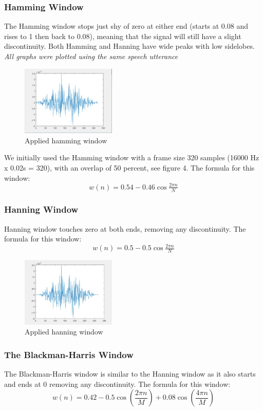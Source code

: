 \documentclass[	DIV=calc,%
							paper=a4,%
							fontsize=9.8pt,%
							twocolumn]{scrartcl}	 					%
\begin{document}
\subsubsection{Hamming Window}
The Hamming window stops just shy of zero at either end (starts at 0.08 and rises to 1 then back to 0.08), meaning that the signal will still have a slight discontinuity.
Both Hamming and Hanning have wide peaks with low sidelobes.
\textit{All graphs were plotted using the same speech utterance}
\begin{figure}[ht]
	\centering
	\includegraphics[width=0.4\textwidth]{hamming}
	\captionsetup{justification=centering}
	\caption{Applied hamming window}
\end{figure}


We initially used the Hamming window with a frame size 320 samples (16000 Hz x 0.02s = 320), with an overlap of 50 percent, see figure 4.
 The formula for this window:
\[w(n) = 0.54 - 0.46 \cos \tfrac{2\pi n}{N}\]


\subsubsection{Hanning Window}
Hanning window touches zero at both ends, removing any discontinuity.
 The formula for this window:
\[w(n) = 0.5 - 0.5 \cos \tfrac{2\pi n}{N}\]
\begin{figure}[ht]
	\centering
	\includegraphics[width=0.4\textwidth]{hanning}
	\captionsetup{justification=centering}
	\caption{Applied hanning window}
\end{figure}

\subsubsection{The Blackman-Harris Window}
The Blackman-Harris window is similar to the Hanning window as it also starts and ends at 0  removing any discontinuity.
The formula for this window: 
\[w(n) = 0.42 - 0.5 \cos (\frac{2\pi n}{M})+0.08\cos (\frac{4\pi n}{M})\]
\end{document}
